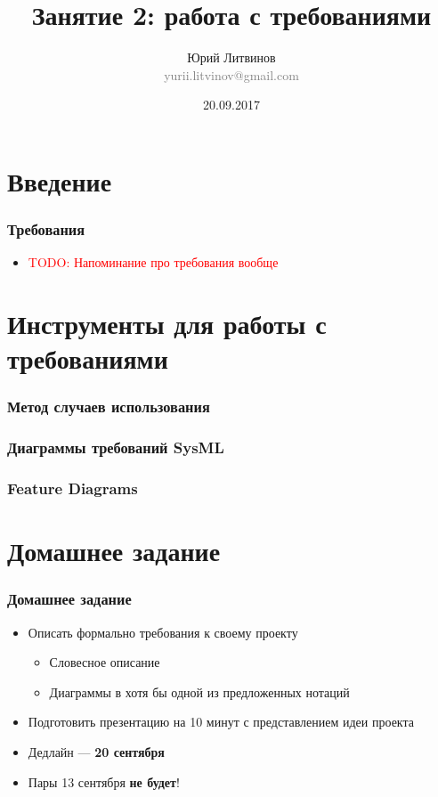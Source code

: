 \documentclass[xetex,mathserif,serif]{beamer}
\title{Занятие 2: работа с требованиями}
\author[Юрий Литвинов]{Юрий Литвинов\\\small{\textcolor{gray}{yurii.litvinov@gmail.com}}}
\date{20.09.2017}
\newcommand{\todo}[1] {
	\begin{center}\textcolor{red}{TODO: #1}\end{center}
}
\begin{document}
	\frame{\titlepage}

	\section{Введение}

	\begin{frame}
		\frametitle{Требования}
		\begin{itemize}
			\item \todo{Напоминание про требования вообще}
		\end{itemize}
	\end{frame}

	\section{Инструменты для работы с требованиями}

	\begin{frame}
		\frametitle{Метод случаев использования}
	\end{frame}

	\begin{frame}
		\frametitle{Диаграммы требований SysML}
	\end{frame}

	\begin{frame}
		\frametitle{Feature Diagrams}
	\end{frame}

	\section{Домашнее задание}

	\begin{frame}
		\frametitle{Домашнее задание}
		\begin{itemize}
			\item Описать формально требования к своему проекту
			\begin{itemize}
				\item Словесное описание
				\item Диаграммы в хотя бы одной из предложенных нотаций
			\end{itemize}
			\item Подготовить презентацию на 10 минут с представлением идеи проекта
			\item Дедлайн --- \textbf{20 сентября}
			\item Пары 13 сентября \textbf{не будет}!
		\end{itemize}
	\end{frame}
\end{document}
